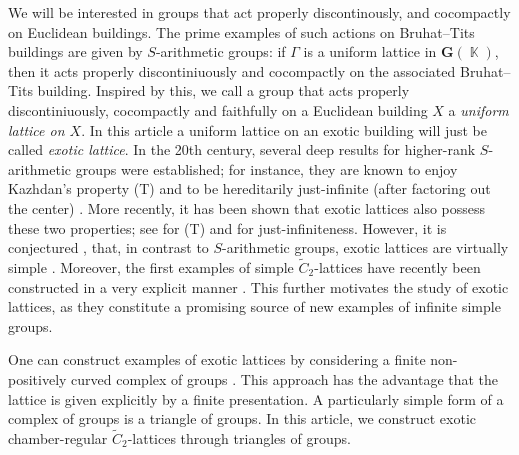 \documentclass[dvipsnames]{article}
\theoremstyle{definition}
\theoremstyle{remark}
\DeclareMathOperator{\KK}{\mathbb K}
\begin{document}
    We will be interested in groups that act properly discontinously, and cocompactly on Euclidean buildings.
    The prime examples of such actions on Bruhat--Tits buildings are given by $S$-arithmetic groups: if $\Gamma$ is a uniform lattice in $\textbf{G}(\KK)$, then it acts properly discontiniuously and cocompactly on the associated Bruhat--Tits building.
    Inspired by this, we call a group that acts properly discontiniuously, cocompactly and faithfully on a Euclidean building $X$ a \textit{uniform lattice on $X$}. In this article a uniform lattice on an exotic building will just be called \textit{exotic lattice}.
    In the 20th century, several deep results for higher-rank $S$-arithmetic groups were established; for instance, they are known to enjoy Kazhdan's property (T) \cite{Kazhdan} and to be hereditarily just-infinite (after factoring out the center) \cite{MargulisNormalSubgroups}. More recently, it has been shown that exotic lattices also possess these two properties; see \cite{Zuk,Oppenheim} for (T) and \cite{BaderFurmanLecureux,LecureuxWitzel} for just-infiniteness.
    However, it is conjectured \cite{BaderCapraceLecureux, LecureuxWitzel}, that, in contrast to $S$-arithmetic groups, exotic lattices are virtually simple \cite[Conjecture 1.3]{BaderCapraceLecureux}. Moreover, the first examples of simple $\tilde C_2$-lattices have recently been constructed in a very explicit manner \cite{TitzMiteWitzel}. This further motivates the study of exotic lattices, as they constitute a promising source of new examples of infinite simple groups.

    One can construct examples of exotic lattices by considering a finite non-positively curved complex of groups \cite[Chapter III.C]{BridsonHaefliger}. This approach has the advantage that the lattice is given explicitly by a finite presentation.
    A particularly simple form of a complex of groups is a triangle of groups. In this article, we construct exotic chamber-regular $\tilde C_2$-lattices through triangles of groups.
    
\end{document}
